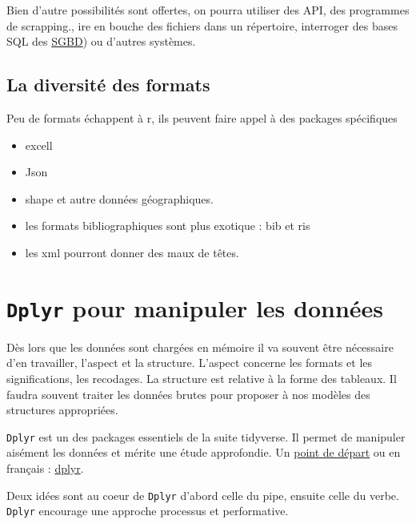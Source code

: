 \documentclass[
]{book}
\providecommand{\tightlist}{%
  \setlength{\itemsep}{0pt}\setlength{\parskip}{0pt}}
\begin{document}
Bien d'autre possibilités sont offertes, on pourra utiliser des API, des programmes de scrapping., ire en bouche des fichiers dans un répertoire, interroger des bases SQL des \href{https://sql.sh/sgbd}{SGBD}) ou d'autres systèmes.

\hypertarget{la-diversituxe9-des-formats}{%
\subsection{La diversité des formats}\label{la-diversituxe9-des-formats}}

Peu de formats échappent à r, ils peuvent faire appel à des packages spécifiques

\begin{itemize}
\tightlist
\item
  excell
\item
  Json
\item
  shape et autre données géographiques.
\item
  les formats bibliographiques sont plus exotique : bib et ris
\item
  les xml pourront donner des maux de têtes.
\end{itemize}

\hypertarget{dplyr-pour-manipuler-les-donnuxe9es}{%
\section{\texorpdfstring{\texttt{Dplyr} pour manipuler les données}{Dplyr pour manipuler les données}}\label{dplyr-pour-manipuler-les-donnuxe9es}}

Dès lors que les données sont chargées en mémoire il va souvent être nécessaire d'en travailler, l'aspect et la structure. L'aspect concerne les formats et les significations, les recodages. La structure est relative à la forme des tableaux. Il faudra souvent traiter les données brutes pour proposer à nos modèles des structures appropriées.

\texttt{Dplyr} est un des packages essentiels de la suite tidyverse. Il permet de manipuler aisément les données et mérite une étude approfondie. Un \href{https://dplyr.tidyverse.org/articles/dplyr.html}{point de départ} ou en français : \href{http://larmarange.github.io/analyse-R/manipuler-les-donnees-avec-dplyr.html}{dplyr}.

Deux idées sont au coeur de \texttt{Dplyr} d'abord celle du pipe, ensuite celle du verbe. \texttt{Dplyr} encourage une approche processus et performative.
\end{document}
